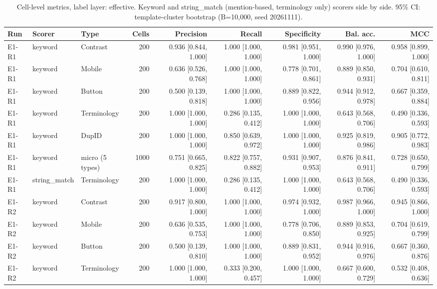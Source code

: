 \begin{table}[t]
\centering
\small
\caption{Cell-level metrics, label layer: effective. Keyword and string\_match (mention-based, terminology only) scorers side by side. 95\% CI: template-cluster bootstrap (B=10,000, seed 20261111).}
\label{tab:e7-cells-effective}
\begin{tabular}{lllrrrrrr}
\toprule
Run & Scorer & Type & Cells & Precision & Recall & Specificity & Bal. acc. & MCC \\
\midrule
E1-R1 & keyword & Contrast & 200 & 0.936 [0.844, 1.000] & 1.000 [1.000, 1.000] & 0.981 [0.951, 1.000] & 0.990 [0.976, 1.000] & 0.958 [0.899, 1.000] \\
E1-R1 & keyword & Mobile & 200 & 0.636 [0.526, 0.768] & 1.000 [1.000, 1.000] & 0.778 [0.701, 0.861] & 0.889 [0.850, 0.931] & 0.704 [0.610, 0.811] \\
E1-R1 & keyword & Button & 200 & 0.500 [0.139, 0.818] & 1.000 [1.000, 1.000] & 0.889 [0.822, 0.956] & 0.944 [0.912, 0.978] & 0.667 [0.359, 0.884] \\
E1-R1 & keyword & Terminology & 200 & 1.000 [1.000, 1.000] & 0.286 [0.135, 0.412] & 1.000 [1.000, 1.000] & 0.643 [0.568, 0.706] & 0.490 [0.336, 0.593] \\
E1-R1 & keyword & DupID & 200 & 1.000 [1.000, 1.000] & 0.850 [0.639, 0.972] & 1.000 [1.000, 1.000] & 0.925 [0.819, 0.986] & 0.905 [0.772, 0.983] \\
E1-R1 & keyword & micro (5 types) & 1000 & 0.751 [0.665, 0.825] & 0.822 [0.757, 0.882] & 0.931 [0.907, 0.953] & 0.876 [0.841, 0.911] & 0.728 [0.650, 0.799] \\
E1-R1 & string\_match & Terminology & 200 & 1.000 [1.000, 1.000] & 0.286 [0.135, 0.412] & 1.000 [1.000, 1.000] & 0.643 [0.568, 0.706] & 0.490 [0.336, 0.593] \\
E1-R2 & keyword & Contrast & 200 & 0.917 [0.800, 1.000] & 1.000 [1.000, 1.000] & 0.974 [0.932, 1.000] & 0.987 [0.966, 1.000] & 0.945 [0.866, 1.000] \\
E1-R2 & keyword & Mobile & 200 & 0.636 [0.535, 0.753] & 1.000 [1.000, 1.000] & 0.778 [0.706, 0.850] & 0.889 [0.853, 0.925] & 0.704 [0.619, 0.799] \\
E1-R2 & keyword & Button & 200 & 0.500 [0.139, 0.810] & 1.000 [1.000, 1.000] & 0.889 [0.831, 0.952] & 0.944 [0.916, 0.976] & 0.667 [0.360, 0.876] \\
E1-R2 & keyword & Terminology & 200 & 1.000 [1.000, 1.000] & 0.333 [0.200, 0.457] & 1.000 [1.000, 1.000] & 0.667 [0.600, 0.729] & 0.532 [0.408, 0.636] \\

\end{tabular}
\end{table}
